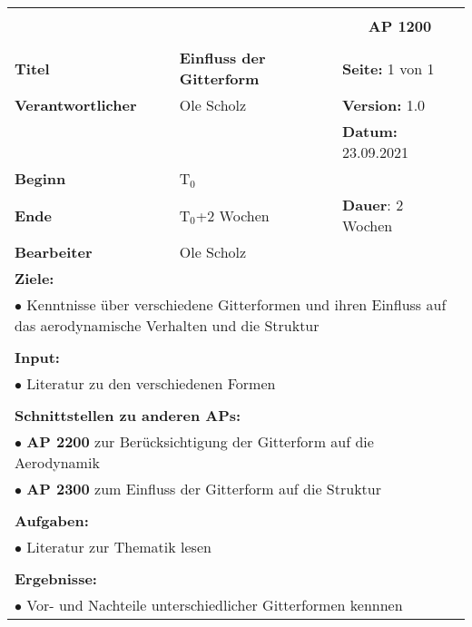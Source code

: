 \clearpage
\begin{table}[!h]
	\begin{center}
		\begin{tabular}{|p{35mm}||p{55mm}|p{50mm}||p{40mm}|}
			\hline
			\multicolumn{3}{|l||}{\textbf{}} & \multicolumn{1}{c|}{}\\
			\multicolumn{3}{|l||}{\textbf{}} & \multicolumn{1}{c|}{\textbf{AP 1200}}\\
			\multicolumn{3}{|l||}{\textbf{}} & \multicolumn{1}{c|}{}\\
			\hline\hline
			\textbf{Titel} & \multicolumn{2}{p{7cm}||}{\textbf{Einfluss der Gitterform}} 
			& \textbf{Seite:} 1 von 1\\
			\hline
			\textbf{Verantwortlicher} & \multicolumn{2}{l||}{Ole Scholz} & \textbf{Version:} 1.0\\
			\hline
			\multicolumn{3}{|l||}{} & \textbf{Datum:} 23.09.2021\\
			\hline\hline
			\textbf{Beginn} & \multicolumn{2}{l||}{T$_0$} & \\
			\hline
			\textbf{Ende} & \multicolumn{2}{l||}{T$_0$+2 Wochen} & \textbf{Dauer}: 2 Wochen\\
			\hline\hline
			\textbf{Bearbeiter} & \multicolumn{3}{l|}{Ole Scholz}\\
			\hline\hline
			\multicolumn{4}{|p{150mm}|}{\textbf{Ziele:}}\\
			\multicolumn{4}{|p{150mm}|}{$\bullet$ Kenntnisse über verschiedene Gitterformen und ihren Einfluss auf das aerodynamische Verhalten und die Struktur}\\
			\multicolumn{4}{|p{150mm}|}{}\\
			\multicolumn{4}{|p{150mm}|}{\textbf{Input:}}\\
			\multicolumn{4}{|p{150mm}|}{$\bullet$ Literatur zu den verschiedenen Formen}\\
			\multicolumn{4}{|p{150mm}|}{}\\
			\multicolumn{4}{|p{150mm}|}{\textbf{Schnittstellen zu anderen APs:}}\\
			\multicolumn{4}{|p{150mm}|}{$\bullet$ \textbf{AP 2200} zur Berücksichtigung der Gitterform auf die Aerodynamik}\\
			\multicolumn{4}{|p{150mm}|}{$\bullet$ \textbf{AP 2300} zum Einfluss der Gitterform auf die Struktur}\\
			\multicolumn{4}{|p{150mm}|}{}\\
			\multicolumn{4}{|p{150mm}|}{\textbf{Aufgaben:}}\\
			\multicolumn{4}{|p{150mm}|}{$\bullet$ Literatur zur Thematik lesen}\\
			\multicolumn{4}{|p{150mm}|}{}\\
			\multicolumn{4}{|p{150mm}|}{\textbf{Ergebnisse:}}\\
			\multicolumn{4}{|p{150mm}|}{$\bullet$ Vor- und Nachteile unterschiedlicher Gitterformen kennnen}\\
			\hline
		\end{tabular}
	\end{center}
\end{table}
	
